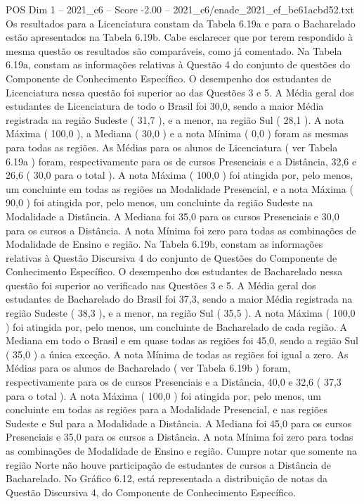 \begin{textsample}{POS Dim 1 – 2021\_c6 – Score -2.00 – 2021\_c6/enade\_2021\_ef\_be61acbd52.txt}
Os resultados para a Licenciatura constam da Tabela 6.19a e para o Bacharelado estão apresentados na Tabela 6.19b.
Cabe esclarecer que por terem respondido à mesma questão os resultados são comparáveis, como já comentado.
Na Tabela 6.19a, constam as informações relativas à Questão 4 do conjunto de questões do Componente de Conhecimento Específico.
O desempenho dos estudantes de Licenciatura nessa questão foi superior ao das Questões 3 e 5.
A Média geral dos estudantes de Licenciatura de todo o Brasil foi 30,0, sendo a maior Média registrada na região Sudeste ( 31,7 ), e a menor, na região Sul ( 28,1 ).
A nota Máxima ( 100,0 ), a Mediana ( 30,0 ) e a nota Mínima ( 0,0 ) foram as mesmas para todas as regiões.
As Médias para os alunos de Licenciatura ( ver Tabela 6.19a ) foram, respectivamente para os de cursos Presenciais e a Distância, 32,6 e 26,6 ( 30,0 para o total ).
A nota Máxima ( 100,0 ) foi atingida por, pelo menos, um concluinte em todas as regiões na Modalidade Presencial, e a nota Máxima ( 90,0 ) foi atingida por, pelo menos, um concluinte da região Sudeste na Modalidade a Distância.
A Mediana foi 35,0 para os cursos Presenciais e 30,0 para os cursos a Distância.
A nota Mínima foi zero para todas as combinações de Modalidade de Ensino e região.
Na Tabela 6.19b, constam as informações relativas à Questão Discursiva 4 do conjunto de Questões do Componente de Conhecimento Específico.
O desempenho dos estudantes de Bacharelado nessa questão foi superior ao verificado nas Questões 3 e 5.
A Média geral dos estudantes de Bacharelado do Brasil foi 37,3, sendo a maior Média registrada na região Sudeste ( 38,3 ), e a menor, na região Sul ( 35,5 ).
A nota Máxima ( 100,0 ) foi atingida por, pelo menos, um concluinte de Bacharelado de cada região.
A Mediana em todo o Brasil e em quase todas as regiões foi 45,0, sendo a região Sul ( 35,0 ) a única exceção.
A nota Mínima de todas as regiões foi igual a zero.
As Médias para os alunos de Bacharelado ( ver Tabela 6.19b ) foram, respectivamente para os de cursos Presenciais e a Distância, 40,0 e 32,6 ( 37,3 para o total ).
A nota Máxima ( 100,0 ) foi atingida por, pelo menos, um concluinte em todas as regiões para a Modalidade Presencial, e nas regiões Sudeste e Sul para a Modalidade a Distância.
A Mediana foi 45,0 para os cursos Presenciais e 35,0 para os cursos a Distância.
A nota Mínima foi zero para todas as combinações de Modalidade de Ensino e região.
Cumpre notar que somente na região Norte não houve participação de estudantes de cursos a Distância de Bacharelado.
No Gráfico 6.12, está representada a distribuição de notas da Questão Discursiva 4, do Componente de Conhecimento Específico.

\end{textsample}
